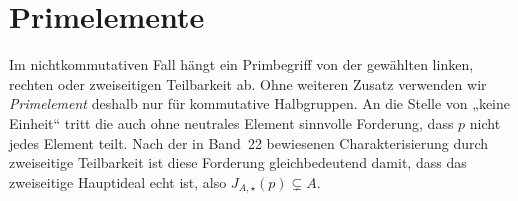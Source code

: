 \documentclass[main.tex]{subfiles}
\begin{document}
\begin{tabproof}
\end{tabproof}

\begin{tabproof}
\end{tabproof}

\section{Primelemente}

Im nichtkommutativen Fall hängt ein Primbegriff von der gewählten linken,
rechten oder zweiseitigen Teilbarkeit ab.  Ohne weiteren Zusatz verwenden
wir \emph{Primelement} deshalb nur für kommutative Halbgruppen.  An die Stelle
von „keine Einheit“ tritt die auch ohne neutrales Element sinnvolle
Forderung, dass \(p\) nicht jedes Element teilt. Nach der in Band~22
bewiesenen Charakterisierung durch zweiseitige Teilbarkeit ist diese
Forderung gleichbedeutend damit, dass das zweiseitige Hauptideal echt ist,
also \(J_{A,\star}(p)\subsetneq A\).
\end{document}
